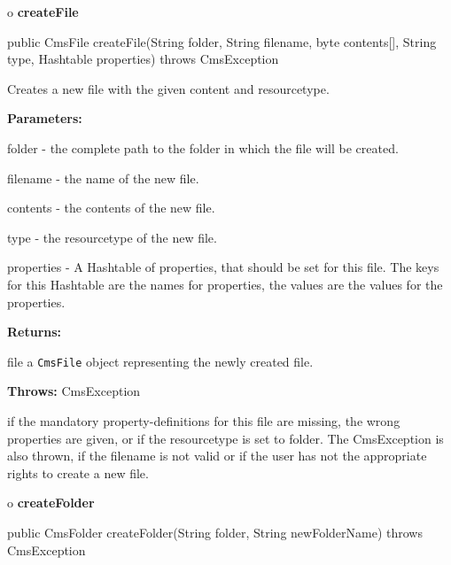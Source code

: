 o {\bf createFile} 

\begin{PRE}
 public CmsFile createFile(String folder,
                           String filename,
                           byte contents[],
                           String type,
                           Hashtable properties) throws CmsException
\end{PRE}

\begin{description}
\htmlDD Creates a new file with the given content and resourcetype. 

\begin{description}
\item {\bf Parameters:}  

folder - the complete path to the folder in which the file will be created.  

filename - the name of the new file.  

contents - the contents of the new file.  

type - the resourcetype of the new file.  

properties - A Hashtable of properties, that should be set for this file. The
keys for this Hashtable are the names for properties, the values are the
values for the properties.  
\item {\bf Returns:}  

file a {\tt CmsFile} object representing the newly created file.  
\item {\bf Throws:} CmsException  

if the mandatory property-definitions for this file are missing, the wrong
properties are given, or if the resourcetype is set to folder. The
CmsException is also thrown, if the filename is not valid or if the user has
not the appropriate rights to create a new file.  
\end{description}

\end{description}

o {\bf createFolder} 

\begin{PRE}
 public CmsFolder createFolder(String folder,
                               String newFolderName) throws CmsException
\end{PRE}

